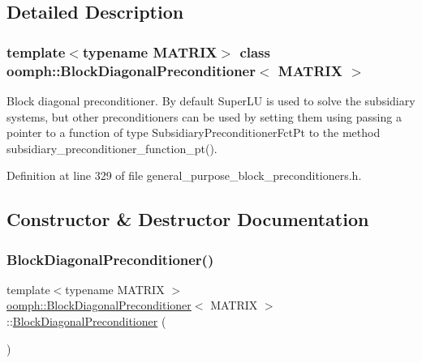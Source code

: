 \subsection{Detailed Description}
\subsubsection*{template$<$typename M\+A\+T\+R\+IX$>$\newline
class oomph\+::\+Block\+Diagonal\+Preconditioner$<$ M\+A\+T\+R\+I\+X $>$}

Block diagonal preconditioner. By default Super\+LU is used to solve the subsidiary systems, but other preconditioners can be used by setting them using passing a pointer to a function of type Subsidiary\+Preconditioner\+Fct\+Pt to the method subsidiary\+\_\+preconditioner\+\_\+function\+\_\+pt(). 

Definition at line 329 of file general\+\_\+purpose\+\_\+block\+\_\+preconditioners.\+h.



\subsection{Constructor \& Destructor Documentation}
\mbox{\label{classoomph_1_1BlockDiagonalPreconditioner_ac96219565cebd7fcf593173b7027e1bb}} 
\subsubsection{\texorpdfstring{Block\+Diagonal\+Preconditioner()}{BlockDiagonalPreconditioner()}\hspace{0.1cm}{\footnotesize\ttfamily [1/2]}}
{\footnotesize\ttfamily template$<$typename M\+A\+T\+R\+IX $>$ \\
\hyperlink{classoomph_1_1BlockDiagonalPreconditioner}{oomph\+::\+Block\+Diagonal\+Preconditioner}$<$ M\+A\+T\+R\+IX $>$\+::\hyperlink{classoomph_1_1BlockDiagonalPreconditioner}{Block\+Diagonal\+Preconditioner} (\begin{DoxyParamCaption}{ }\end{DoxyParamCaption})\hspace{0.3cm}{\ttfamily [inline]}}



